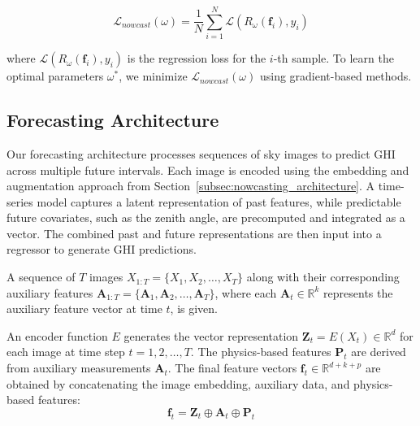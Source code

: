 \[
\mathcal{L}_{nowcast}(\omega) = \frac{1}{N} \sum_{i=1}^N \mathcal{L}(R_\omega(\mathbf{f}_i), y_i)
\]

where \( \mathcal{L}(R_\omega(\mathbf{f}_i), y_i) \) is the regression loss for the \(i\)-th sample. To learn the optimal parameters \( \omega^* \), we minimize \( \mathcal{L}_{nowcast}(\omega) \) using gradient-based methods.

\subsection{Forecasting Architecture}
Our forecasting architecture processes sequences of sky images to predict GHI across multiple future intervals. Each image is encoded using the embedding and augmentation approach from Section~\ref{subsec:nowcasting_architecture}. A time-series model captures a latent representation of past features, while predictable future covariates, such as the zenith angle, are precomputed and integrated as a vector. The combined past and future representations are then input into a regressor to generate GHI predictions.




A sequence of \( T \) images \( X_{1:T} = \{ X_1, X_2, \dots, X_T \} \) along with their corresponding auxiliary features \( \mathbf{A}_{1:T} = \{ \mathbf{A}_1, \mathbf{A}_2, \dots, \mathbf{A}_T \} \), where each \( \mathbf{A}_t \in \mathbb{R}^k \) represents the auxiliary feature vector at time \( t \), is given.

An encoder function \( E \) generates the vector representation \( \mathbf{Z}_t = E(X_t) \in \mathbb{R}^d \) for each image at time step \( t = 1, 2, \dots, T \). The physics-based features \( \mathbf{P}_t \) are derived from auxiliary measurements \( \mathbf{A}_t \). The final feature vectors \( \mathbf{f}_t \in \mathbb{R}^{d+k+p} \) are obtained by concatenating the image embedding, auxiliary data, and physics-based features:
\[
\mathbf{f}_t = \mathbf{Z}_t \oplus \mathbf{A}_t \oplus \mathbf{P}_t
\]

